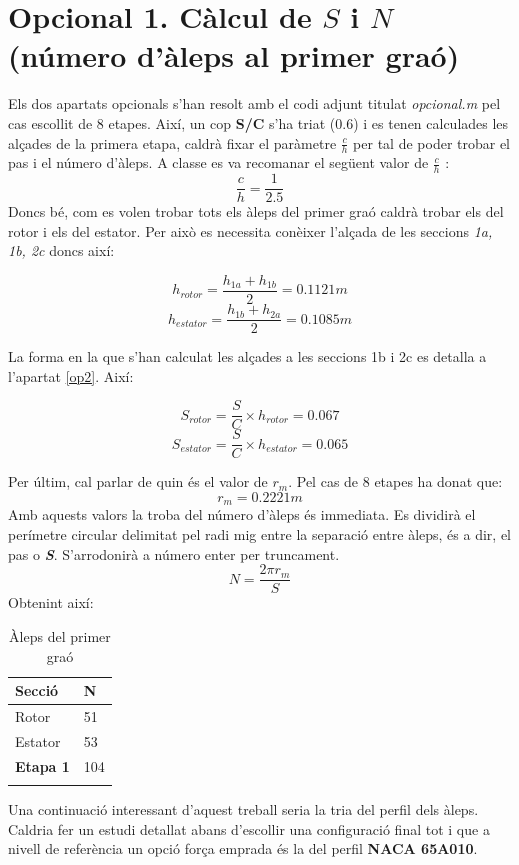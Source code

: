 \section{Opcional 1. Càlcul de $S$ i $N$ (número d'àleps al primer graó)}
\label{op1}
Els dos apartats opcionals s'han resolt amb el codi adjunt titulat \textit{opcional.m} pel cas escollit de 8 etapes. Així, un cop \textbf{S/C} s'ha triat (0.6) i es tenen calculades les alçades de la primera etapa, caldrà fixar el paràmetre $\frac{c}{h}$ per tal de poder trobar el pas i el número d'àleps. A classe es va recomanar el següent valor de $\frac{c}{h}$ :
\begin{equation}
\frac{c}{h} = \frac{1}{2.5}
\end{equation}
Doncs bé, com es volen trobar tots els àleps del primer graó caldrà trobar els del rotor i els del estator. Per això es necessita conèixer l'alçada de les seccions \textit{1a, 1b, 2c} doncs així:
\begin{multicols}{2}
  \begin{equation}
    h_{rotor} = \frac{h_{1a}+h_{1b}}{2} = 0.1121m
  \end{equation}\break
  \begin{equation}
    h_{estator} = \frac{h_{1b}+h_{2a}}{2} = 0.1085m
  \end{equation}
\end{multicols}
La forma en la que s'han calculat les alçades a les seccions 1b i 2c es detalla a l'apartat \ref{op2}.
Així:
\begin{multicols}{2}
  \begin{equation}
    S_{rotor} = \frac{S}{C}\times h_{rotor} = 0.067
  \end{equation}\break
  \begin{equation}
    S_{estator} = \frac{S}{C}\times h_{estator} = 0.065
  \end{equation}
\end{multicols}
Per últim, cal parlar de quin és el valor de $r_m$. Pel cas de 8 etapes ha donat que:
\begin{equation}
r_m = 0.2221m
\end{equation}
Amb aquests valors la troba  del número d'àleps és immediata. Es dividirà el perímetre circular delimitat pel radi mig entre la separació entre àleps, és a dir, el pas o \textbf{\textit{S}}. S'arrodonirà a número enter per truncament.
\begin{equation}
N = \frac{2\pi r_m}{S}
\end{equation}
Obtenint així:
\begin{longtable}[H]{C{2.5cm} C{2.5cm}}
	\toprule[2pt]
	\textbf{Secció} &  \textbf{N} \\ \bottomrule[2pt]
	Rotor & 51\\ \midrule
	Estator & 53\\ \midrule
	\textbf{Etapa 1} & 104\\
	\bottomrule[2pt]
	\caption{Àleps del primer graó}
	\label{aleps}
\end{longtable}
Una continuació interessant d'aquest treball seria la tria del perfil dels àleps. Caldria fer un estudi detallat abans d'escollir una configuració final tot i que a nivell de referència un opció força emprada és la del perfil \textbf{NACA 65A010}.
